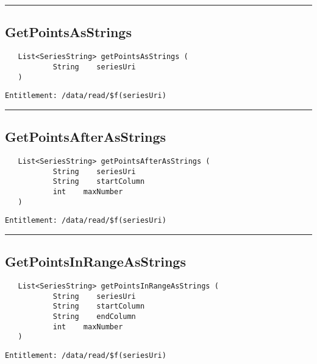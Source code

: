 \rule{12cm}{2pt}
\subsection{GetPointsAsStrings}
\label{Api:GetPointsAsStrings}
\begin{verbatim}
   List<SeriesString> getPointsAsStrings (
           String    seriesUri
   )
\end{verbatim}
\begin{Verbatim}[fontsize=\small, formatcom=\color{Maroon}]
  Entitlement: /data/read/$f(seriesUri)
\end{Verbatim}



\rule{12cm}{2pt}
\subsection{GetPointsAfterAsStrings}
\label{Api:GetPointsAfterAsStrings}
\begin{verbatim}
   List<SeriesString> getPointsAfterAsStrings (
           String    seriesUri
           String    startColumn
           int    maxNumber
   )
\end{verbatim}
\begin{Verbatim}[fontsize=\small, formatcom=\color{Maroon}]
  Entitlement: /data/read/$f(seriesUri)
\end{Verbatim}



\rule{12cm}{2pt}
\subsection{GetPointsInRangeAsStrings}
\label{Api:GetPointsInRangeAsStrings}
\begin{verbatim}
   List<SeriesString> getPointsInRangeAsStrings (
           String    seriesUri
           String    startColumn
           String    endColumn
           int    maxNumber
   )
\end{verbatim}
\begin{Verbatim}[fontsize=\small, formatcom=\color{Maroon}]
  Entitlement: /data/read/$f(seriesUri)
\end{Verbatim}



